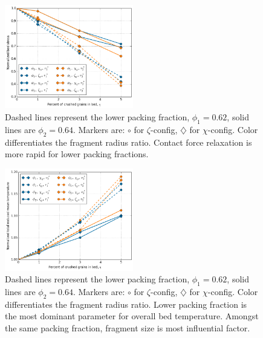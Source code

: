 \begin{figure}[!t]
    \centering
    \includegraphics[width = 0.5\textwidth]{figures/eta-sigma.png}
    \caption{Dashed lines represent the lower packing fraction, $\phi_1 = 0.62$, solid lines are $\phi_2 = 0.64$. Markers are: $\circ$ for $\zeta$-config, $\diamondsuit$ for $\chi$-config. Color differentiates the fragment radius ratio. Contact force relaxation is more rapid for lower packing fractions.}\label{fig:eta-sigma}
\end{figure}

\begin{figure}[!t]
    \centering
    \includegraphics[width = 0.5\textwidth]{figures/eta-theta.png}
    \caption{Dashed lines represent the lower packing fraction, $\phi_1 = 0.62$, solid lines are $\phi_2 = 0.64$. Markers are: $\circ$ for $\zeta$-config, $\diamondsuit$ for $\chi$-config. Color differentiates the fragment radius ratio. Lower packing fraction is the most dominant parameter for overall bed temperature. Amongst the same packing fraction, fragment size is most influential factor.}\label{fig:eta-theta}
\end{figure}


